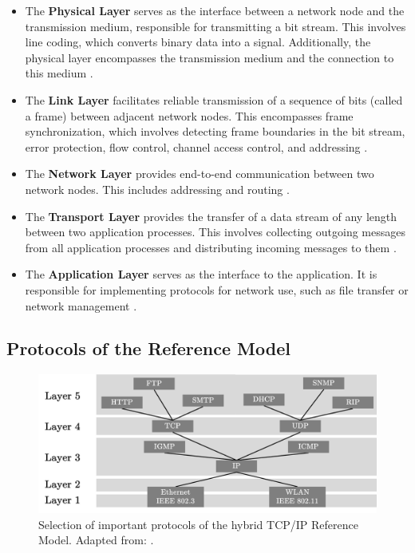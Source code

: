 	
\begin{itemize}
\item The \textbf{Physical Layer} serves as the interface between a network node and the transmission medium, responsible for transmitting a bit stream. This involves line coding, which converts binary data into a signal. Additionally, the physical layer encompasses the transmission medium and the connection to this medium \cite{Tanenbaum2010, Weigel2021}.
\item The \textbf{Link Layer} facilitates reliable transmission of a sequence of bits (called a frame) between adjacent network nodes. This encompasses frame synchronization, which involves detecting frame boundaries in the bit stream, error protection, flow control, channel access control, and addressing \cite{Weigel2021}.
\item The \textbf{Network Layer} provides end-to-end communication between two network nodes. This includes addressing and routing \cite{Tanenbaum2010, Weigel2021}.
\item The \textbf{Transport Layer} provides the transfer of a data stream of any length between two application processes. This involves collecting outgoing messages from all application processes and distributing incoming messages to them \cite{Weigel2021}.
\item The \textbf{Application Layer} serves as the interface to the application. It is responsible for implementing protocols for network use, such as file transfer or network management \cite{Weigel2021}.
\end{itemize}



\subsection{Protocols of the Reference Model}

\begin{figure}[h]
    \centering
    \includegraphics[width=1\linewidth]{figures/tcpip_refmodel/image4.png}
    \caption[Selection of important protocols of the hybrid TCP/IP Reference Model]{Selection of important protocols of the hybrid TCP/IP Reference Model. Adapted from: \cite{Weigel2021}.}
    \label{fig:RefModelProtos}
\end{figure}


